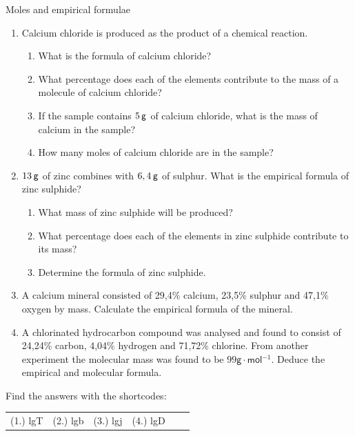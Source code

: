             \begin{exercises}{Moles and empirical formulae
      }
            \nopagebreak
      \label{m38712*id281924}\begin{enumerate}[noitemsep, label=\textbf{\arabic*}. ] 
            \label{m38712*uid73}\item Calcium chloride is produced as the product of a chemical reaction.
\label{m38712*id281940}\begin{enumerate}[noitemsep, label=\textbf{\alph*}. ] 
            \label{m38712*uid74}\item What is the formula of calcium chloride?
\label{m38712*uid75}\item What percentage does each of the elements contribute to the mass of a molecule of calcium chloride?
\label{m38712*uid76}\item If the sample contains $5\phantom{\rule{2pt}{0ex}}\mathsf{g}$ of calcium chloride, what is the mass of calcium in the sample?
\label{m38712*uid77}\item How many moles of calcium chloride are in the sample?
\end{enumerate}
                \label{m38712*uid78}\item $13\phantom{\rule{2pt}{0ex}}\mathsf{g}$ of zinc combines with $6,4\phantom{\rule{2pt}{0ex}}\mathsf{g}$ of sulphur. What is the empirical formula of zinc sulphide?
\label{m38712*id282007}\begin{enumerate}[noitemsep, label=\textbf{\alph*}. ] 
            \label{m38712*uid79}\item What mass of zinc sulphide will be produced?
\label{m38712*uid80}\item What percentage does each of the elements in zinc sulphide contribute to its mass?
\label{m38712*uid81}\item Determine the formula of zinc sulphide.
\end{enumerate}
                \label{m38712*uid82}\item A calcium mineral consisted of 29,4\% calcium, 23,5\% sulphur and 47,1\% oxygen by mass. Calculate the empirical formula of the mineral.\newline
\label{m38712*uid83}\item A chlorinated hydrocarbon compound was analysed and found to consist of 24,24\% carbon, 4,04\% hydrogen and 71,72\% chlorine. From another experiment the molecular mass was found to be $99\mathsf{g}\ensuremath{\cdot}\mathsf{mol}{}^{-1}$. Deduce the empirical and molecular formula.\newline
\end{enumerate}
    \label{m38712*cid7}
\par {} Find the answers with the shortcodes:
 \par \begin{tabular}[h]{cccccc}
 (1.) lgT  &  (2.) lgb  &  (3.) lgj  &  (4.) lgD  & \end{tabular}
\end{exercises}

